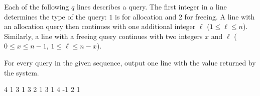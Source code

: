 Each of the following $q$ lines describes a query. The first integer in a line
determines the type of the query: $1$ is for allocation and $2$ for freeing. A
line with an allocation query then continues with one additional integer $\ell$
($1 \leq \ell \leq n$). Similarly, a line with a freeing query continues with
two integers $x$ and $\ell$ ($0 \leq x \leq n-1$, $1 \leq \ell \leq n-x$).



For every query in the given sequence, output one line with the value returned
by the system.



 4
1 3
1 3
2 1 3
1 4
-1
2
1
\sampleEND


